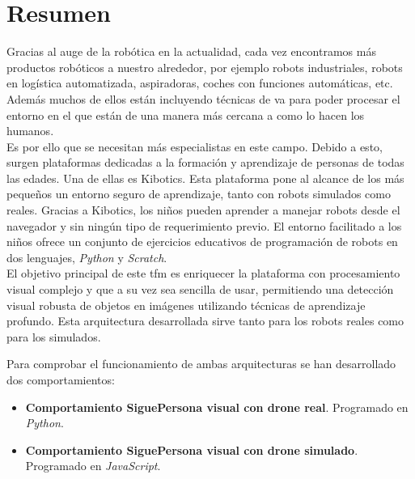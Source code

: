 \chapter*{Resumen}
Gracias al auge de la robótica en la actualidad, cada vez encontramos más productos robóticos a nuestro alrededor, por ejemplo robots industriales, robots en logística automatizada, aspiradoras, coches con funciones automáticas, etc. Además muchos de ellos están incluyendo técnicas de \acrfull{va} para poder procesar el entorno en el que están de una manera más cercana a como lo hacen los humanos.\\

Es por ello que se necesitan más especialistas en este campo. Debido a esto, surgen plataformas dedicadas a la formación y aprendizaje de personas de todas las edades. Una de ellas es Kibotics. Esta plataforma pone al alcance de los más pequeños un entorno seguro de aprendizaje, tanto con robots simulados como reales. Gracias a Kibotics, los niños pueden aprender a manejar robots desde el navegador y sin ningún tipo de requerimiento previo. El entorno facilitado a los niños ofrece un conjunto de ejercicios educativos de programación de robots en dos lenguajes, \textit{Python} y \textit{Scratch}.\\

El objetivo principal de este \acrfull{tfm} es enriquecer la plataforma con procesamiento visual complejo y que a su vez sea sencilla de usar, permitiendo una detección visual robusta de objetos en imágenes utilizando técnicas de aprendizaje profundo. Esta arquitectura desarrollada sirve tanto para los robots reales como para los simulados.

Para comprobar el funcionamiento de ambas arquitecturas se han desarrollado dos comportamientos:
\begin{itemize}
  \item \textbf{Comportamiento SiguePersona visual con drone real}. Programado en \textit{Python}.
  \item \textbf{Comportamiento  SiguePersona  visual  con  drone  simulado}. Programado en \textit{JavaScript}.
\end{itemize}

